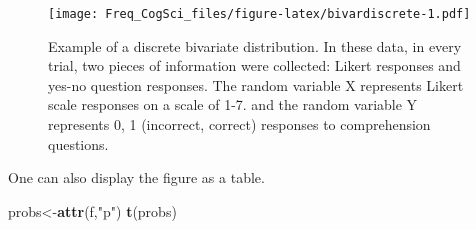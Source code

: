 \documentclass[12pt,]{krantz}
\newenvironment{Shaded}{\begin{snugshade}}{\end{snugshade}}
\newcommand{\CommentTok}[1]{\textcolor[rgb]{0.56,0.35,0.01}{\textit{#1}}}
\newcommand{\DataTypeTok}[1]{\textcolor[rgb]{0.13,0.29,0.53}{#1}}
\newcommand{\DecValTok}[1]{\textcolor[rgb]{0.00,0.00,0.81}{#1}}
\newcommand{\KeywordTok}[1]{\textcolor[rgb]{0.13,0.29,0.53}{\textbf{#1}}}
\newcommand{\NormalTok}[1]{#1}
\newcommand{\OperatorTok}[1]{\textcolor[rgb]{0.81,0.36,0.00}{\textbf{#1}}}
\newcommand{\OtherTok}[1]{\textcolor[rgb]{0.56,0.35,0.01}{#1}}
\newcommand{\StringTok}[1]{\textcolor[rgb]{0.31,0.60,0.02}{#1}}
\begin{document}
\begin{Shaded}
\end{Shaded}

\begin{figure}
\centering
\texttt{[image: Freq\_CogSci\_files/figure-latex/bivardiscrete-1.pdf]}
\caption{\label{fig:bivardiscrete}Example of a discrete bivariate distribution. In these data, in every trial, two pieces of information were collected: Likert responses and yes-no question responses. The random variable X represents Likert scale responses on a scale of 1-7. and the random variable Y represents 0, 1 (incorrect, correct) responses to comprehension questions.}
\end{figure}

One can also display the figure as a table.

\begin{Shaded}
\begin{Highlighting}[]
\NormalTok{probs<-}\KeywordTok{attr}\NormalTok{(f,}\StringTok{"p"}\NormalTok{)}
\KeywordTok{t}\NormalTok{(probs)}
\end{Highlighting}
\end{Shaded}
\end{document}
